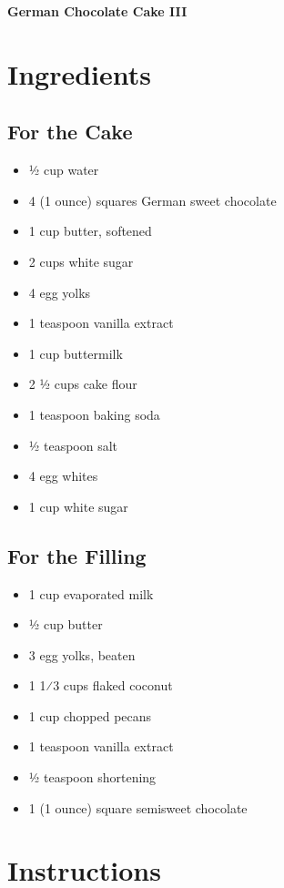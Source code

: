 \documentclass[10pt]{article}
\begin{document}
\begin{center}
{\huge \bfseries \headingfont German Chocolate Cake III}
\end{center}
\vspace{1em}
\vspace{1em}
\begin{paracol}{2}
\section*{Ingredients}
\raggedright
\subsection*{For the Cake}
\begin{itemize}[leftmargin=*]
\item 1⁄2 cup water
\item 4 (1 ounce) squares German sweet chocolate
\item 1 cup butter, softened
\item 2 cups white sugar
\item 4 egg yolks
\item 1 teaspoon vanilla extract
\item 1 cup buttermilk
\item 2 1⁄2 cups cake flour
\item 1 teaspoon baking soda
\item 1⁄2 teaspoon salt
\item 4 egg whites
\item 1 cup white sugar
\end{itemize}
\subsection*{For the Filling}
\begin{itemize}[leftmargin=*]
\item 1 cup evaporated milk
\item 1⁄2 cup butter
\item 3 egg yolks, beaten
\item 1 1⁄3 cups flaked coconut
\item 1 cup chopped pecans
\item 1 teaspoon vanilla extract
\item 1⁄2 teaspoon shortening
\item 1 (1 ounce) square semisweet chocolate
\end{itemize}
\switchcolumn
\section*{Instructions}

\end{paracol}
\end{document}
